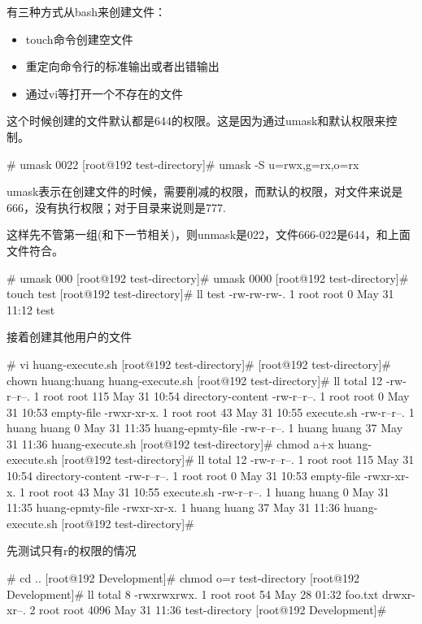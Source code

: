 有三种方式从bash来创建文件：
\begin{itemize}
\item touch命令创建空文件
\item 重定向命令行的标准输出或者出错输出
\item 通过vi等打开一个不存在的文件
\end{itemize}

这个时候创建的文件默认都是644的权限。这是因为通过umask和默认权限来控制。

\begin{Bash}
# umask
0022
[root@192 test-directory]# umask -S
u=rwx,g=rx,o=rx
\end{Bash}

umask表示在创建文件的时候，需要削减的权限，而默认的权限，对文件来说是666，没有执行权限；对于目录来说则是777.

这样先不管第一组(和下一节相关)，则unmask是022，文件666-022是644，和上面文件符合。

\begin{Bash}# umask 000
[root@192 test-directory]# umask
0000
[root@192 test-directory]# touch test
[root@192 test-directory]# ll test
-rw-rw-rw-. 1 root root 0 May 31 11:12 test
\end{Bash}

接着创建其他用户的文件
\begin{Bash}
# vi huang-execute.sh
[root@192 test-directory]# 
[root@192 test-directory]# chown huang:huang huang-execute.sh 
[root@192 test-directory]# ll
total 12
-rw-r--r--. 1 root  root  115 May 31 10:54 directory-content
-rw-r--r--. 1 root  root    0 May 31 10:53 empty-file
-rwxr-xr-x. 1 root  root   43 May 31 10:55 execute.sh
-rw-r--r--. 1 huang huang   0 May 31 11:35 huang-epmty-file
-rw-r--r--. 1 huang huang  37 May 31 11:36 huang-execute.sh
[root@192 test-directory]# chmod a+x huang-execute.sh 
[root@192 test-directory]# ll
total 12
-rw-r--r--. 1 root  root  115 May 31 10:54 directory-content
-rw-r--r--. 1 root  root    0 May 31 10:53 empty-file
-rwxr-xr-x. 1 root  root   43 May 31 10:55 execute.sh
-rw-r--r--. 1 huang huang   0 May 31 11:35 huang-epmty-file
-rwxr-xr-x. 1 huang huang  37 May 31 11:36 huang-execute.sh
[root@192 test-directory]# 

\end{Bash}

先测试只有r的权限的情况
\begin{Bash}# cd ..
[root@192 Development]# chmod o=r test-directory
[root@192 Development]# ll
total 8
-rwxrwxrwx. 1 root root   54 May 28 01:32 foo.txt
drwxr-xr--. 2 root root 4096 May 31 11:36 test-directory
[root@192 Development]# 

\end{Bash}


